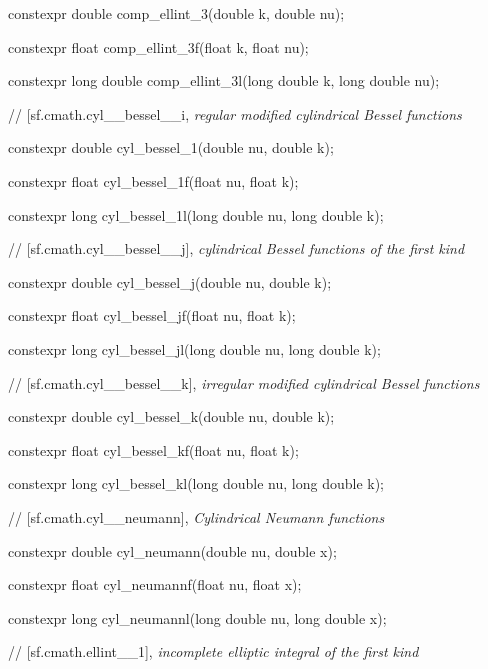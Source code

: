 \documentclass[prd,twocolumn,amsmath,amssymb,nofootinbib,eqsecnum]{revtex4-1}
\newcommand{\highlight}[1]{{\color{red} #1}}
\begin{document}
{\highlight{constexpr} double comp\_ellint\_3(double k, double nu);
	
\highlight{constexpr} float comp\_ellint\_3f(float k, float nu);
	
\highlight{constexpr} long double comp\_ellint\_3l(long double k, long double nu);

\vspace{2ex}
// [sf.cmath.cyl\_\_bessel\_\_i, {\em regular modified cylindrical Bessel functions}
\vspace{2ex}

\highlight{constexpr} double cyl\_bessel\_1(double nu, double k);
	
\highlight{constexpr} float cyl\_bessel\_1f(float nu, float k);
	
\highlight{constexpr} long cyl\_bessel\_1l(long double nu, long double k);

\vspace{2ex}
// [sf.cmath.cyl\_\_bessel\_\_j], {\em cylindrical Bessel functions of the first kind}
\vspace{2ex}

\highlight{constexpr} double cyl\_bessel\_j(double nu, double k);
	
\highlight{constexpr} float cyl\_bessel\_jf(float nu, float k);
	
\highlight{constexpr} long cyl\_bessel\_jl(long double nu, long double k);

\vspace{2ex}
// [sf.cmath.cyl\_\_bessel\_\_k], {\em irregular modified cylindrical Bessel functions}
\vspace{2ex}

\highlight{constexpr} double cyl\_bessel\_k(double nu, double k);
	
\highlight{constexpr} float cyl\_bessel\_kf(float nu, float k);
	
\highlight{constexpr} long cyl\_bessel\_kl(long double nu, long double k);

\vspace{2ex}
// [sf.cmath.cyl\_\_neumann], {\em Cylindrical Neumann functions}
\vspace{2ex}

\highlight{constexpr} double cyl\_neumann(double nu, double x);
	
\highlight{constexpr} float cyl\_neumannf(float nu, float x);
	
\highlight{constexpr} long cyl\_neumannl(long double nu, long double x);

\vspace{2ex}
// [sf.cmath.ellint\_\_1], {\em incomplete elliptic integral of the first kind}
\vspace{2ex}

}
\end{document}

